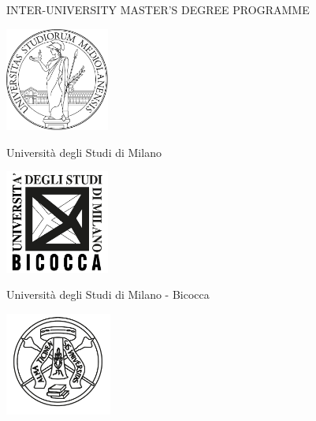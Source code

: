 \frenchspacing
\frontmatter



\begin{titlepage}


\thispagestyle{empty}

\begin{center}
\vskip 1cm
{\large INTER-UNIVERSITY MASTER'S DEGREE PROGRAMME}

\vskip 1cm
\begin{minipage}[t]{18cm}%
\begin{center}%
\begin{minipage}[t]{4cm}%
\begin{center}
\includegraphics[height=3.4cm]{logos/unimi_logo}%

\Large Universit\`a degli Studi di Milano
\end{center}
\end{minipage}%
\hspace{1.5cm}%
\begin{minipage}[t]{6cm}%
\begin{center}
\includegraphics[height=3.4cm]{logos/unimib_logo}%

\Large Universit\`a degli Studi di Milano - Bicocca
\end{center}
\end{minipage}%
\hspace{1.5cm}%
\begin{minipage}[t]{4cm}%
\begin{center}
\includegraphics[height=3.4cm]{logos/unipv_logo}


\end{center}
\end{minipage}
\end{center}
\end{minipage}
\end{center}
\end{titlepage}
